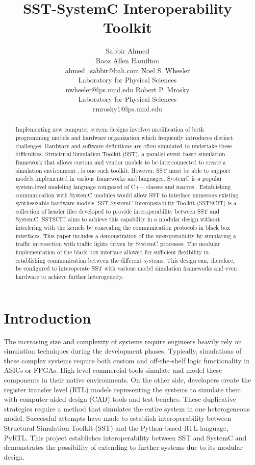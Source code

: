 \documentclass{article}
\title{SST-SystemC Interoperability Toolkit}
\author{
  Sabbir Ahmed \\
  Booz Allen Hamilton \\
  ahmed\_sabbir@bah.com
  \And
  Noel S. Wheeler \\
  Laboratory for Physical Sciences \\
  nwheeler@lps.umd.edu
  \And
  Robert P. Mrosky \\
  Laboratory for Physical Sciences \\
  rmrosky1@lps.umd.edu
}
\begin{document}
  \maketitle

  \begin{abstract}
    Implementing new computer system designs involves modification of both programming models and
    hardware organization which frequently introduces distinct challenges. Hardware and software
    definitions are often simulated to undertake these difficulties. Structural Simulation Toolkit
    (SST), a parallel event-based simulation framework that allows custom and vendor models to be
    interconnected to create a simulation environment \cite{sst}, is one such toolkit. However, SST
    must be able to support models implemented in various frameworks and languages. SystemC is a
    popular system-level modeling language composed of C++ classes and macros \cite{sysc}.
    Establishing communication with SystemC modules would allow SST to interface numerous existing
    synthesizable hardware models. SST-SystemC Interoperability Toolkit (SSTSCIT) is a collection of
    header files developed to provide interoperability between SST and SystemC. SSTSCIT aims to
    achieve this capability in a modular design without interfering with the kernels by concealing
    the communication protocols in black box interfaces. This paper includes a demonstration of
    the interoperability by simulating a traffic intersection with traffic lights driven by SystemC
    processes. The modular implementation of the black box interface allowed for sufficient
    flexibility in establishing communication between the different systems. This design can,
    therefore, be configured to interoperate SST with various model simulation frameworks and
    even hardware to achieve further heterogeneity.
  \end{abstract}

  \section{Introduction}
  The increasing size and complexity of systems require engineers heavily rely on simulation
  techniques during the development phases. Typically, simulations of these complex systems require
  both custom and off-the-shelf logic functionality in ASICs or FPGAs. High-level commercial tools
  simulate and model these components in their native environments. On the other side, developers
  create the register transfer level (RTL) models representing the systems to simulate them with
  computer-aided design (CAD) tools and test benches. These duplicative strategies require a method
  that simulates the entire system in one heterogeneous model. Successful attempts have made to
  establish interoperability between Structural Simulation Toolkit (SST) and the Python-based RTL
  language, PyRTL. This project establishes interoperability between SST and SystemC and
  demonstrates the possibility of extending to further systems due to its modular design.
\end{document}
